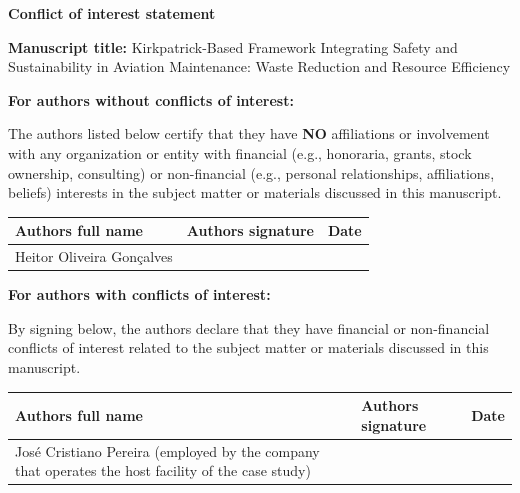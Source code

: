 \documentclass[12pt,a4paper]{article}
\newcommand{\sig}{\rule[-1.1cm]{0pt}{2.5cm}}
\begin{document}
\begin{center}
{\large\bfseries Conflict of interest statement}
\end{center}

\textbf{Manuscript title:} Kirkpatrick-Based Framework Integrating Safety and Sustainability in Aviation Maintenance: Waste Reduction and Resource Efficiency

\vspace{6pt}
\textbf{For authors without conflicts of interest:}

The authors listed below certify that they have \textbf{NO} affiliations or involvement with any organization or entity with financial (e.g., honoraria, grants, stock ownership, consulting) or non-financial (e.g., personal relationships, affiliations, beliefs) interests in the subject matter or materials discussed in this manuscript.

\begin{tabularx}{\textwidth}{|p{5.3cm}|X|p{2.4cm}|}
\hline
\textbf{Authors full name} & \textbf{Authors signature} & \textbf{Date} \\
\hline
Heitor Oliveira Gonçalves & \sig & \\
\hline
\end{tabularx}

\newpage

\textbf{For authors with conflicts of interest:}

By signing below, the authors declare that they have financial or non-financial conflicts of interest related to the subject matter or materials discussed in this manuscript.

\begin{tabularx}{\textwidth}{|p{5.3cm}|X|p{2.4cm}|}
\hline
\textbf{Authors full name} & \textbf{Authors signature} & \textbf{Date} \\
\hline
José Cristiano Pereira (employed by the company that operates the host facility of the case study) & \sig & \\
\hline
\end{tabularx}
\end{document}

